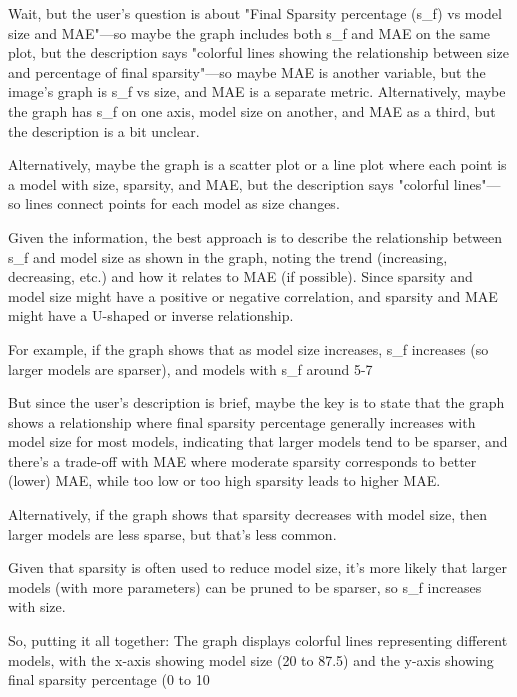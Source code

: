 Wait, but the user's question is about "Final Sparsity percentage (s_f) vs model size and MAE"—so maybe the graph includes both s_f and MAE on the same plot, but the description says "colorful lines showing the relationship between size and percentage of final sparsity"—so maybe MAE is another variable, but the image's graph is s_f vs size, and MAE is a separate metric. Alternatively, maybe the graph has s_f on one axis, model size on another, and MAE as a third, but the description is a bit unclear. 

Alternatively, maybe the graph is a scatter plot or a line plot where each point is a model with size, sparsity, and MAE, but the description says "colorful lines"—so lines connect points for each model as size changes. 

Given the information, the best approach is to describe the relationship between s_f and model size as shown in the graph, noting the trend (increasing, decreasing, etc.) and how it relates to MAE (if possible). Since sparsity and model size might have a positive or negative correlation, and sparsity and MAE might have a U-shaped or inverse relationship. 

For example, if the graph shows that as model size increases, s_f increases (so larger models are sparser), and models with s_f around 5-7%

But since the user's description is brief, maybe the key is to state that the graph shows a relationship where final sparsity percentage generally increases with model size for most models, indicating that larger models tend to be sparser, and there's a trade-off with MAE where moderate sparsity corresponds to better (lower) MAE, while too low or too high sparsity leads to higher MAE. 

Alternatively, if the graph shows that sparsity decreases with model size, then larger models are less sparse, but that's less common. 

Given that sparsity is often used to reduce model size, it's more likely that larger models (with more parameters) can be pruned to be sparser, so s_f increases with size. 

So, putting it all together: The graph displays colorful lines representing different models, with the x-axis showing model size (20 to 87.5) and the y-axis showing final sparsity percentage (0 to 10%

